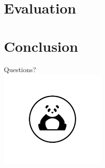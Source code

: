 \documentclass[10pt]{beamer}
\begin{document}
\section{Evaluation}




\section{Conclusion}
% 


\printbibliography

\begin{frame}
\centering\Huge
	Questions? \\
	\includegraphics[width=0.4\textwidth]{images/panda_logo.png}
\end{frame}
\end{document}
